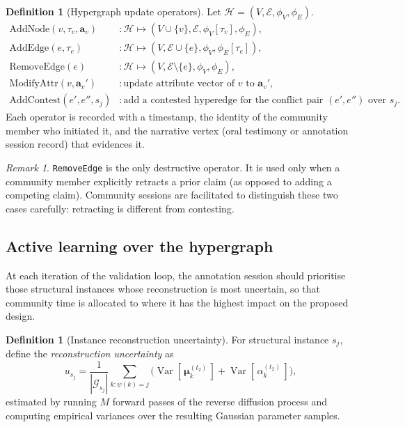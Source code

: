 \documentclass[11pt,a4paper]{article}
\theoremstyle{plain}
\theoremstyle{definition}
\newtheorem{definition}[theorem]{Definition}
\theoremstyle{remark}
\newtheorem{remark}[theorem]{Remark}
\newcommand{\Var}{\operatorname{Var}}
\newcommand{\GS}{\mathcal{G}}
\newcommand{\HG}{\mathcal{H}}
\newcommand{\inst}{\psi}
\begin{document}
\begin{definition}[Hypergraph update operators]
\label{def:operators}
Let $\HG = (V, \mathcal{E}, \phi_V, \phi_E)$.
\begin{align*}
  \mathrm{AddNode}(v, \tau_v, \mathbf{a}_v)
  &: \HG \mapsto (V \cup \{v\}, \mathcal{E}, \phi_V[\tau_v], \phi_E),\\
  \mathrm{AddEdge}(e, \tau_e)
  &: \HG \mapsto (V, \mathcal{E} \cup \{e\}, \phi_V, \phi_E[\tau_e]),\\
  \mathrm{RemoveEdge}(e)
  &: \HG \mapsto (V, \mathcal{E} \setminus \{e\}, \phi_V, \phi_E),\\
  \mathrm{ModifyAttr}(v, \mathbf{a}_v')
  &: \text{update attribute vector of } v \text{ to } \mathbf{a}_v',\\
  \mathrm{AddContest}(e', e'', s_j)
  &: \text{add a contested hyperedge for the conflict pair }
     (e', e'') \text{ over } s_j.
\end{align*}
Each operator is recorded with a timestamp, the identity of the
community member who initiated it, and the narrative vertex (oral
testimony or annotation session record) that evidences it.
\end{definition}

\begin{remark}
\texttt{RemoveEdge} is the only destructive operator. It is used only
when a community member explicitly retracts a prior claim (as opposed
to adding a competing claim). Community sessions are facilitated to
distinguish these two cases carefully: retracting is different from
contesting.
\end{remark}

\subsection{Active learning over the hypergraph}
\label{sec:layer5_al}

At each iteration of the validation loop, the annotation session
should prioritise those structural instances whose reconstruction is
most uncertain, so that community time is allocated to where it has
the highest impact on the proposed design.

\begin{definition}[Instance reconstruction uncertainty]
\label{def:uncertainty}
For structural instance $s_j$, define the \emph{reconstruction
uncertainty} as
\[
  u_{s_j}
  = \frac{1}{|\GS_{s_j}|}
    \sum_{k : \inst(k) = j}
    \bigl(
      \Var[\,{\boldsymbol\mu}_k^{(t_2)}\,]
      + \Var[\,\alpha_k^{(t_2)}\,]
    \bigr),
\]
estimated by running $M$ forward passes of the reverse diffusion
process and computing empirical variances over the resulting Gaussian
parameter samples.
\end{definition}
\end{document}
